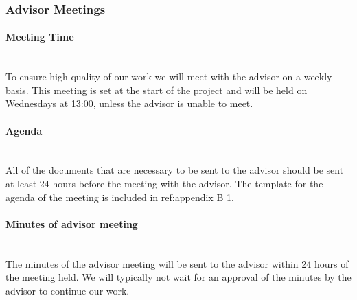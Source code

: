 \documentclass[../document.tex]{subfiles}
\begin{document}
\subsubsection{Advisor Meetings}
\paragraph{Meeting Time} \ \\
To ensure high quality of our work we will meet with the advisor on a weekly basis. This meeting is set at the start of the project and will be held on Wednesdays at 13:00, unless the advisor is unable to meet.

\paragraph{Agenda} \ \\
All of the documents that are necessary to be sent to the advisor should be sent at least 24 hours before the meeting with the advisor. The template for the agenda of the meeting is included in {\color{red} ref:}appendix B 1.

\paragraph{Minutes of advisor meeting} \ \\
The minutes of the advisor meeting will be sent to the advisor within 24 hours of the meeting held. We will typically not wait for an approval of the minutes by the advisor to continue our work.
\end{document}
